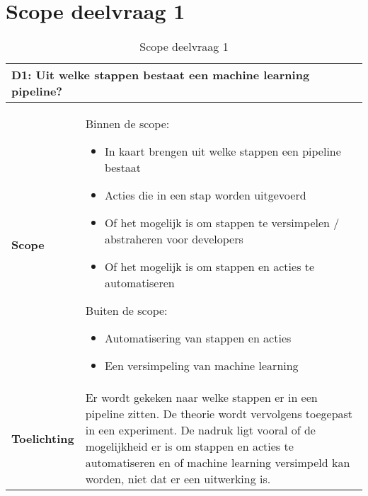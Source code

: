 \section{Scope deelvraag 1}\label{appendix:scope-subquestion-1}
\begin{table}[hbt!]
  \centering
  \caption{Scope deelvraag 1}
  \vspace*{.5\baselineskip}
  \begin{tabular}{|p{.215\linewidth}|p{.72\linewidth}|}
  \hline
  \multicolumn{2}{|p{.97\linewidth}|}{\textbf{D1: Uit welke stappen bestaat een machine learning pipeline?}} \\ \hline
    \textbf{Scope}&
      Binnen de scope:
      \begin{itemize}
        \item In kaart brengen uit welke stappen een pipeline bestaat
        \item Acties die in een stap worden uitgevoerd
        \item Of het mogelijk is om stappen te versimpelen / abstraheren voor developers
        \item Of het mogelijk is om stappen en acties te automatiseren
      \end{itemize}
      Buiten de scope:
      \begin{itemize}
        \item Automatisering van stappen en acties
        \item Een versimpeling van machine learning
      \end{itemize}
    \\ \hline
    \textbf{Toelichting}&
      Er wordt gekeken naar welke stappen er in een pipeline zitten. De theorie wordt vervolgens toegepast in een experiment. De nadruk ligt vooral of de mogelijkheid er is om stappen en acties te automatiseren en of machine learning versimpeld kan worden, niet dat er een uitwerking is.
    \\ \hline
  \end{tabular}
  \label{table:scope-subquestion-1}
\end{table}

\newpage

